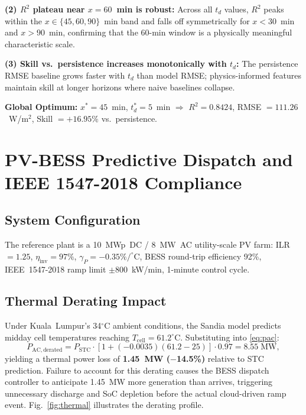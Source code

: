 \documentclass[conference]{IEEEtran}
\begin{document}
\textbf{(2) $R^2$ plateau near $x=60$~min is robust:} Across all $t_d$
values, $R^2$ peaks within the $x\in\{45,60,90\}$~min band and falls off
symmetrically for $x<30$~min and $x>90$~min, confirming that the 60-min
window is a physically meaningful characteristic scale.

\textbf{(3) Skill vs.\ persistence increases monotonically with $t_d$:}
The persistence RMSE baseline grows faster with $t_d$ than model RMSE;
physics-informed features maintain skill at longer horizons where naive
baselines collapse.

\textbf{Global Optimum:} $x^*=45$~min, $t_d^*=5$~min $\Rightarrow$
$R^2=0.8424$, RMSE $=111.26$~W/m$^2$, Skill $=+16.95\%$ vs.\ persistence.

\section{PV-BESS Predictive Dispatch and IEEE 1547-2018 Compliance}

\subsection{System Configuration}

The reference plant is a 10~MWp~DC / 8~MW~AC utility-scale PV farm: ILR~$=1.25$,
$\eta_{\mathrm{inv}}=97\%$, $\gamma_P=-0.35\%/^{\circ}$C, BESS round-trip
efficiency 92\%, IEEE~1547-2018 ramp limit $\pm800$~kW/min, 1-minute control
cycle.

\subsection{Thermal Derating Impact}

Under Kuala~Lumpur's 34$^{\circ}$C ambient conditions, the Sandia model
predicts midday cell temperatures reaching $T_{\mathrm{cell}}=61.2^{\circ}$C.
Substituting into \eqref{eq:pac}:
\begin{equation}
  P_{\mathrm{AC,derated}} = P_{\mathrm{STC}}
    \cdot[1+(-0.0035)(61.2-25)]
    \cdot0.97 = 8.55\;\mathrm{MW},
  \label{eq:derate}
\end{equation}
yielding a thermal power loss of \textbf{1.45~MW ($-$14.5\%)} relative to STC
prediction. Failure to account for this derating causes the BESS dispatch
controller to anticipate 1.45~MW more generation than arrives, triggering
unnecessary discharge and SoC depletion before the actual cloud-driven ramp
event. Fig.~\ref{fig:thermal} illustrates the derating profile.
\end{document}
